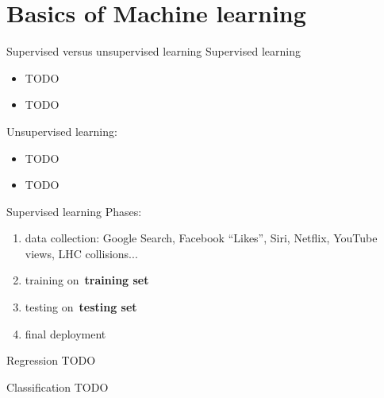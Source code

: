 \documentclass{beamer}
\newcommand{\todo}{\alert{TODO}}
\begin{document}

  \section{Basics of Machine learning}

  \begin{frame}{Supervised versus unsupervised learning}
    Supervised learning
    \begin{itemize}[<+- | alert@+>]
      \item \todo
      \item \todo
    \end{itemize}
    \pause

    Unsupervised learning:
    \begin{itemize}[<+- | alert@+>]
      \item \todo
      \item \todo
    \end{itemize}
  \end{frame}

  \begin{frame}{Supervised learning}
    Phases:
    \pause
    \begin{enumerate}[<+- | alert@+>]
      \item data collection: Google Search, Facebook ``Likes'', Siri, Netflix, YouTube views, LHC collisions...
      \item training on~\textbf{training set}
      \item testing on~\textbf{testing set}
      \item final deployment
    \end{enumerate}
    \pause
  \end{frame}

  \begin{frame}{Regression}
    \todo
  \end{frame}

  \begin{frame}{Classification}
    \todo
  \end{frame}
\end{document}
